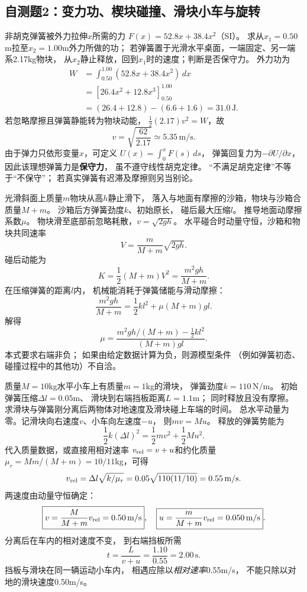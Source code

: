 \subsection{自测题2：变力功、楔块碰撞、滑块小车与旋转}

\problemtext 非胡克弹簧被外力拉伸$x$所需的力
$F(x)=52.8x+38.4x^2$（SI）。
求从$x_1=0.50$m拉至$x_2=1.00$m外力所做的功；
若弹簧置于光滑水平桌面，一端固定、另一端系2.17kg物块，
从$x_2$静止释放，回到$x_1$时的速度；判断是否保守力。
\workings
外力功为
\[
\begin{aligned}
W&=\int_{0.50}^{1.00}(52.8x+38.4x^2)\,dx\\
&=\left[26.4x^2+12.8x^3\right]_{0.50}^{1.00}\\
&=(26.4+12.8)-(6.6+1.6)
=\boxed{31.0\,\mathrm J}.
\end{aligned}
\]
若忽略摩擦且弹簧静能转为物块动能，
$\tfrac12(2.17)v^2=W$，故
\[
\boxed{v=\sqrt{\frac{62}{2.17}}\simeq5.35\,\mathrm{m/s}}.
\]
由于弹力只依形变量$x$，可定义
$U(x)=\int_0^xF(s)\,ds$，
弹簧回复力为$-\partial U/\partial x$，
因此该理想弹簧力是\textbf{保守力}，
虽不遵守线性胡克定律。
\crosscheck “不满足胡克定律”不等于“不保守”；
若真实弹簧有迟滞及摩擦则另当别论。

\problemtext 光滑斜面上质量$m$物块从高$h$静止滑下，
落入与地面有摩擦的沙箱，物块与沙箱合质量$M+m$。
沙箱后方弹簧劲度$k$、初始原长，
碰后最大压缩$l$。
推导地面动摩擦系数$\mu$。
\workings
物块滑至底部前忽略耗散，$v=\sqrt{2gh}$。
水平碰合时动量守恒，沙箱和物块共同速率
\[
V=\frac{m}{M+m}\sqrt{2gh}.
\]
碰后动能为
\[
K=\frac12(M+m)V^2=\frac{m^2gh}{M+m}.
\]
在压缩弹簧的距离$l$内，
机械能消耗于弹簧储能与滑动摩擦：
\[
\frac{m^2gh}{M+m}=\frac12kl^2+\mu(M+m)gl.
\]
解得
\[
\boxed{\mu=
\frac{m^2gh/(M+m)-\tfrac12kl^2}{(M+m)gl}}.
\]
\crosscheck 本式要求右端非负；
如果由给定数据计算为负，则源模型条件
（例如弹簧初态、碰撞过程中的其他功）不自洽。

\problemtext 质量$M=10$kg水平小车上有质量$m=1$kg的滑块，
弹簧劲度$k=110\,\mathrm{N/m}$。
初始弹簧压缩$\Delta l=0.05$m、
滑块到右端挡板距离$L=1.1$m；
同时释放且没有摩擦。
求滑块与弹簧刚分离后两物体对地速度及滑块碰上车端的时间。
\workings
总水平动量为零。记滑块向右速度$v$、小车向左速度$-u$，
则$mv=Mu$。
释放的弹簧势能为
\[
\frac12k(\Delta l)^2
=\frac12mv^2+\frac12Mu^2.
\]
代入质量数据，或直接用相对速率
$v_{\rm rel}=v+u$和约化质量
$\mu_r=Mm/(M+m)=10/11$kg，可得
\[
v_{\rm rel}=\Delta l\sqrt{k/\mu_r}
=0.05\sqrt{110(11/10)}=0.55\,\mathrm{m/s}.
\]
两速度由动量守恒确定：
\[
\boxed{v=\frac{M}{M+m}v_{\rm rel}=0.50\,\mathrm{m/s}},
\quad
\boxed{u=\frac{m}{M+m}v_{\rm rel}=0.050\,\mathrm{m/s}}.
\]
分离后在车内的相对速度不变，
到右端挡板所需
\[
\boxed{t=\frac L{v+u}=\frac{1.10}{0.55}=2.00\,\mathrm s}.
\]
\crosscheck 挡板与滑块在同一辆运动小车内，
相遇应除以\emph{相对速率}0.55m/s，
不能只除以对地的滑块速度0.50m/s。

